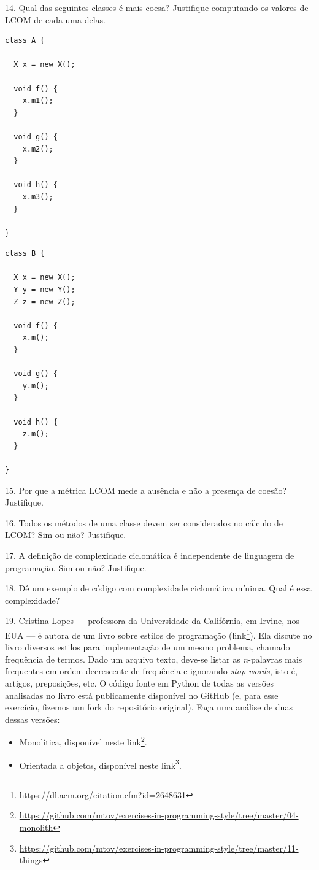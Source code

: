 \documentclass[
  11pt,
  twoside]{book}
\DeclareRobustCommand{\href}[2]{#2\footnote{\url{#1}}}
\begin{document}
14. Qual das seguintes classes é mais coesa? Justifique computando os
valores de LCOM de cada uma delas.

\begin{lstlisting}
class A {

  X x = new X();

  void f() {
    x.m1();
  }

  void g() {
    x.m2();
  }

  void h() {
    x.m3();
  }

}
\end{lstlisting}

\begin{lstlisting}
class B {

  X x = new X();
  Y y = new Y();
  Z z = new Z();

  void f() {
    x.m();
  }

  void g() {
    y.m();
  }

  void h() {
    z.m();
  }

}
\end{lstlisting}

15. Por que a métrica LCOM mede a ausência e não a presença de coesão?
Justifique.

16. Todos os métodos de uma classe devem ser considerados no cálculo de
LCOM? Sim ou não? Justifique.

17. A definição de complexidade ciclomática é independente de linguagem
de programação. Sim ou não? Justifique.

18. Dê um exemplo de código com complexidade ciclomática mínima. Qual é
essa complexidade?

19. Cristina Lopes --- professora da Universidade da Califórnia, em
Irvine, nos EUA --- é autora de um livro sobre estilos de programação
(\href{https://dl.acm.org/citation.cfm?id=2648631}{link}). Ela discute
no livro diversos estilos para implementação de um mesmo problema,
chamado frequência de termos. Dado um arquivo texto, deve-se listar as
\emph{n}-palavras mais frequentes em ordem decrescente de frequência e
ignorando \emph{stop words}, isto é, artigos, preposições, etc. O código
fonte em Python de todas as versões analisadas no livro está
publicamente disponível no GitHub (e, para esse exercício, fizemos um
fork do repositório original). Faça uma análise de duas dessas versões:

\begin{itemize}
\item
  Monolítica, disponível neste
  \href{https://github.com/mtov/exercises-in-programming-style/tree/master/04-monolith}{link}.
\item
  Orientada a objetos, disponível neste
  \href{https://github.com/mtov/exercises-in-programming-style/tree/master/11-things}{link}.
\end{itemize}
\end{document}
